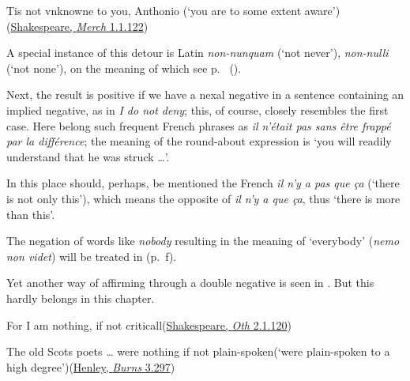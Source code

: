 \ea \label{ex:07-01}
Tis not vnknowne to you, Anthonio \phantom{x} (`you are to some extent aware')\\\hfill(\href{https://internetshakespeare.uvic.ca/doc/MV_F1/scene/index.html#tln-130}{Shakespeare, \textit{Merch} 1.1.122})
\z

A special instance of this detour is Latin \textit{non-nunquam} (`not never'), \textit{non-nulli} (`not none'), on the meaning of which see p.~\pageref{08-non-nulli} (). %

Next, the result is positive if we have a nexal negative in a sentence containing an implied negative, as in \textit{I do not deny}; this, of course, closely resembles the first case. Here belong such frequent French phrases as \textit{il n'était pas sans être frappé par la différence}; the meaning of the round-about expression is `you will readily understand that he was struck {\dots}'.

In this place should, perhaps, be mentioned the French \textit{il n'y a pas que ça} (`there is not only this'), which means the opposite of \textit{il n'y a que ça}, thus `there is more than this'. 

The negation of words like \textit{nobody} resulting in the meaning of `everybody' (\textit{nemo non videt}) will be treated in  (p.~\pageref{08-negativing-nobody}f). %

Yet another way of affirming through a double negative is seen in . But this hardly belongs in this chapter.

\ea \label{ex:07-02}
\ea For I am nothing, if not criticall\hfill(\href{https://internetshakespeare.uvic.ca/doc/Oth_F1/scene/2.1/index.html#tln-890}{Shakespeare, \textit{Oth} 2.1.120}) 

\ex The old Scots poets {\dots} were nothing if not plain-spoken\newline (`were plain-spoken to a high degree')\hfill(\href{https://archive.org/details/poetryrobertbur02burngoog/page/296/mode/2up?q=%22plain-spoken%22&view=theater}{Henley, \textit{Burns} 3.297}) %
\z
\z
{}

\bigskip
{}


